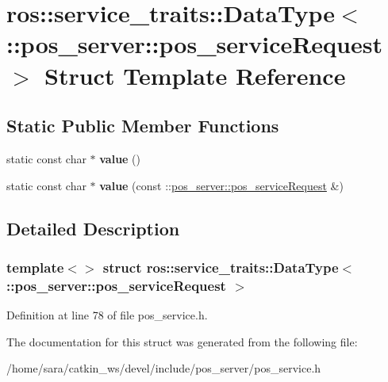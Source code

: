 \hypertarget{structros_1_1service__traits_1_1DataType_3_01_1_1pos__server_1_1pos__serviceRequest_01_4}{}\section{ros\+:\+:service\+\_\+traits\+:\+:Data\+Type$<$ \+:\+:pos\+\_\+server\+:\+:pos\+\_\+service\+Request $>$ Struct Template Reference}
\label{structros_1_1service__traits_1_1DataType_3_01_1_1pos__server_1_1pos__serviceRequest_01_4}
\subsection*{Static Public Member Functions}
\begin{DoxyCompactItemize}
\item 
\mbox{\label{structros_1_1service__traits_1_1DataType_3_01_1_1pos__server_1_1pos__serviceRequest_01_4_ac927910291d932f309a9b040823d3346}} 
static const char $\ast$ {\bfseries value} ()
\item 
\mbox{\label{structros_1_1service__traits_1_1DataType_3_01_1_1pos__server_1_1pos__serviceRequest_01_4_aa4a7b60504c3c94d19f32bcb63963eb0}} 
static const char $\ast$ {\bfseries value} (const \+::\hyperlink{structpos__server_1_1pos__serviceRequest__}{pos\+\_\+server\+::pos\+\_\+service\+Request} \&)
\end{DoxyCompactItemize}


\subsection{Detailed Description}
\subsubsection*{template$<$$>$\newline
struct ros\+::service\+\_\+traits\+::\+Data\+Type$<$ \+::pos\+\_\+server\+::pos\+\_\+service\+Request $>$}



Definition at line 78 of file pos\+\_\+service.\+h.



The documentation for this struct was generated from the following file\+:\begin{DoxyCompactItemize}
\item 
/home/sara/catkin\+\_\+ws/devel/include/pos\+\_\+server/pos\+\_\+service.\+h\end{DoxyCompactItemize}
